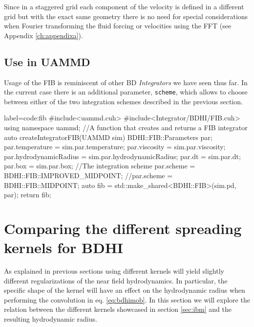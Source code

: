 \documentclass[ twoside,openright,titlepage,numbers=noenddot,%
headinclude,footinclude,cleardoublepage=empty,abstract=on,
BCOR=5mm,paper=a4,fontsize=11pt, dvipsnames
]{scrreprt}
\def\ucpp{uammd_cpp_lexer.py:UAMMDCppLexer -x}
\begin{document}
Since in a staggered grid each component of the velocity is defined in a different grid but with the exact same geometry there is no need for special considerations when Fourier transforming the fluid forcing or velocities using the \gls{FFT} (see Appendix \ref{ch:appendixa}).
\subsection*{Use in UAMMD}
Usage of the \gls{FIB} is reminiscent of other \gls{BD} \emph{Integrators} we have seen thus far. In the current case there is an additional parameter, \texttt{scheme}, which allows to choose between either of the two integration schemes described in the previous section.

\begin{code2}{label=code:fib}
#include<uammd.cuh>
#include<Integrator/BDHI/FIB.cuh>
using namespace uammd;
//A function that creates and returns a FIB integrator
auto createIntegratorFIB(UAMMD sim){   
  BDHI::FIB::Parameters par;
  par.temperature = sim.par.temperature;
  par.viscosity = sim.par.viscosity;
  par.hydrodynamicRadius = sim.par.hydrodynamicRadius;
  par.dt = sim.par.dt;  
  par.box = sim.par.box;
  //The integration scheme
  par.scheme = BDHI::FIB::IMPROVED_MIDPOINT;
  //par.scheme = BDHI::FIB::MIDPOINT;
  auto fib = std::make_shared<BDHI::FIB>(sim.pd, par);
  return fib;
}
\end{code2}


\section{Comparing the different spreading kernels for BDHI}\label{sec:kernelcomp}
As explained in previous sections using different kernels will yield slightly different regularizations of the near field hydrodynamics. In particular, the specific shape of the kernel will have an effect on the hydrodynamic radius when performing the convolution in eq. \eqref{eq:bdhimob}. In this section we will explore the relation between the different kernels showcased in section \ref{sec:ibm} and the resulting hydrodynamic radius. 
\end{document}

